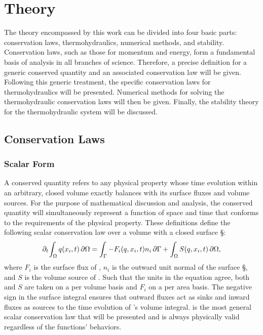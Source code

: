 \documentclass[12pt]{../UWMadThesis}
\begin{document}
\chapter{Theory}

The theory encompassed by this work can be divided into four basic parts: conservation laws, thermohydraulics, numerical methods, and stability.
Conservation laws, such as those for momentum and energy, form a fundamental basis of analysis in all branches of science.
Therefore, a precise definition for a generic conserved quantity and an associated conservation law will be given.
Following this generic treatment, the specific conservation laws for thermohydraulics will be presented.
Numerical methods for solving the thermohydraulic conservation laws will then be given.
Finally, the stability theory for the thermohydraulic system will be discussed.

\section{Conservation Laws}
\label{CLawDefinition}

\subsection{Scalar Form}
A conserved quantity \q{} refers to any physical property whose time evolution within an arbitrary, closed volume exactly balances with its surface fluxes and volume sources.
For the purpose of mathematical discussion and analysis, the conserved quantity \q{} will simultaneously represent a function of space and time that conforms to the requirements of the physical property.
These definitions define the following scalar conservation law over a volume \V{} with a closed surface \S{}:%
\begin{equation}%
    \pdt\!\IntV \q(x_i,t) \dV = \IntS -F_i(\q,x_i,t) n_i\dS + \IntV S(\q,x_i,t) \dV,
    \label{Eqn:GeneralIntegralCLaw}
\end{equation}
where $F_i$ is the surface flux of \q{}, $n_i$ is the outward unit normal of the surface \S{}, and $S$ is the volume source of \q{}.
Such that the units in the equation agree, both \q{} and $S$ are taken on a per volume basis and $F_i$ on a per area basis.
The negative sign in the surface integral ensures that outward fluxes act as sinks and inward fluxes as sources to the time evolution of \q{}'s volume integral.
 is the most general scalar conservation law that will be presented and is always physically valid regardless of the functions' behaviors.
\end{document}
